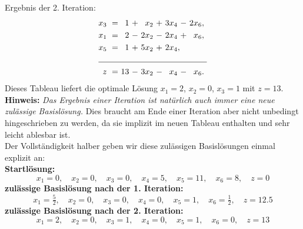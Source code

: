 \documentclass[a4paper]{article}
\begin{document}
Ergebnis der 2. Iteration:
\begin{align*}
\begin{alignedat}{5}
x_3 &\ = &\  1 &\ + &\  x_2 &\ + &\ 3x_4 &\ - &\ 2x_6,\ \\
x_1 &\ = &\  2 &\ - &\ 2x_2 &\ - &\ 2x_4 &\ + &\  x_6,\ \\
x_5 &\ = &\  1 &\ + &\ 5x_2 &\ + &\ 2x_4 &,    &        \\ \cline{1-9}
z   &\ = &\ 13 &\ - &\ 3x_2 &\ - &\  x_4 &\ - &\  x_6.\
\end{alignedat}
\end{align*}
Dieses Tableau liefert die optimale Lösung $x_1=2$, $x_2 = 0$, $x_3 = 1$ mit $z=13$.\\
\textbf{Hinweis:} \emph{Das Ergebnis einer Iteration ist natürlich auch immer eine neue zulässige Basislösung.} Dies braucht am Ende einer Iteration aber nicht unbedingt hingeschrieben zu werden, da sie implizit im neuen Tableau enthalten und sehr leicht ablesbar ist. \\
Der Vollständigkeit halber geben wir diese zulässigen Basislösungen einmal explizit an:\\
{\textbf{Startlösung:}}
\begin{equation*}
 x_1 = 0, \quad x_2 = 0, \quad x_3 = 0, \quad x_4 = 5, \quad x_5 = 11, \quad x_6 = 8, \quad z = 0 
\end{equation*}
{\textbf{zulässige Basislösung nach der 1. Iteration:}}
\begin{equation*}
 x_1 = \tfrac{5}{2}, \quad x_2 = 0, \quad x_3 = 0, \quad x_4 = 0, \quad x_5 = 1, \quad x_6 = \tfrac{1}{2}, \quad z = 12.5 
\end{equation*}
{\textbf{zulässige Basislösung nach der 2. Iteration:}}
\begin{equation*}
 x_1 = 2, \quad x_2 = 0, \quad x_3 = 1, \quad x_4 = 0, \quad x_5 = 1, \quad x_6 = 0, \quad z = 13 
\end{equation*}
\end{document}

